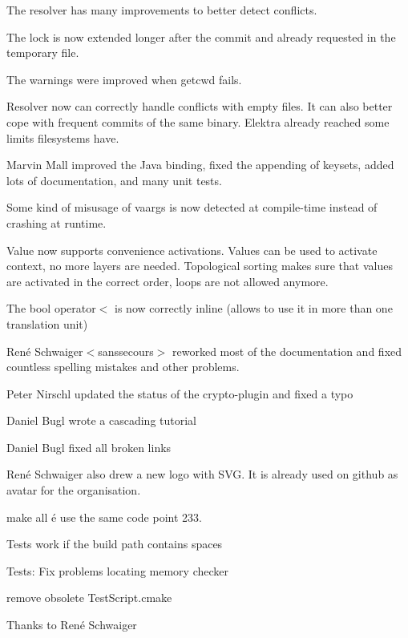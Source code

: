 The resolver has many improvements to better detect conflicts.

The lock is now extended longer after the commit and already requested in the temporary file.

The warnings were improved when {\ttfamily getcwd} fails.

Resolver now can correctly handle conflicts with empty files. It can also better cope with frequent commits of the same binary. Elektra already reached some limits filesystems have.

Marvin Mall improved the Java binding, fixed the appending of keysets, added lots of documentation, and many unit tests.

Some kind of misusage of vaargs is now detected at compile-\/time instead of crashing at runtime.

Value now supports convenience activations. Values can be used to activate context, no more layers are needed. Topological sorting makes sure that values are activated in the correct order, loops are not allowed anymore.

The {\ttfamily bool operator$<$} is now correctly inline (allows to use it in more than one translation unit)

René Schwaiger$<$sanssecours$>$ reworked most of the documentation and fixed countless spelling mistakes and other problems.


\begin{DoxyItemize}
\item Peter Nirschl updated the status of the crypto-\/plugin and fixed a typo
\item Daniel Bugl wrote a cascading tutorial
\item Daniel Bugl fixed all broken links
\item René Schwaiger also drew a new logo with S\+VG. It is already used on github as avatar for the organisation.
\item make all é use the same code point 233.
\end{DoxyItemize}


\begin{DoxyItemize}
\item Tests work if the build path contains spaces
\item Tests\+: Fix problems locating memory checker
\item remove obsolete Test\+Script.\+cmake
\end{DoxyItemize}

Thanks to René Schwaiger

